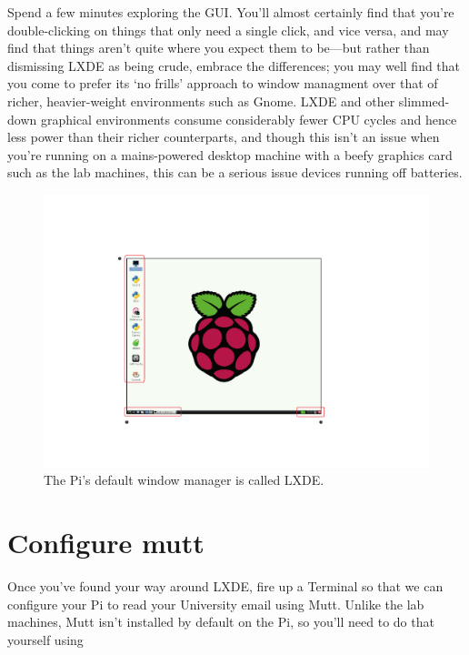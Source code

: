 Spend a few minutes exploring the GUI. You'll almost certainly find that you're double-clicking on things that only need a single click, and vice versa, and may find that things aren't quite where you expect them to be---but rather than dismissing LXDE as being crude, embrace the differences; you may well find that you come to prefer its `no frills' approach to window managment over that of richer, heavier-weight environments such as Gnome. LXDE and other slimmed-down graphical environments consume considerably fewer CPU cycles and hence less power than their richer counterparts, and though this isn't an issue when you're running on a mains-powered desktop machine with a beefy graphics card such as the lab machines, this can be a serious issue devices running off batteries. 

\begin{figure}
\centerline{\includegraphics[width=14cm]{images/lxde-desktop}}
\caption{The Pi's default window manager is called LXDE.}\label{figure:lxde-desktop}
\end{figure}

\section{Configure mutt}

Once you've found your way around LXDE, fire up a Terminal so that we can configure your Pi to read your University email using Mutt. Unlike the lab machines, Mutt isn't installed by default on the Pi, so you'll need to do that yourself using



